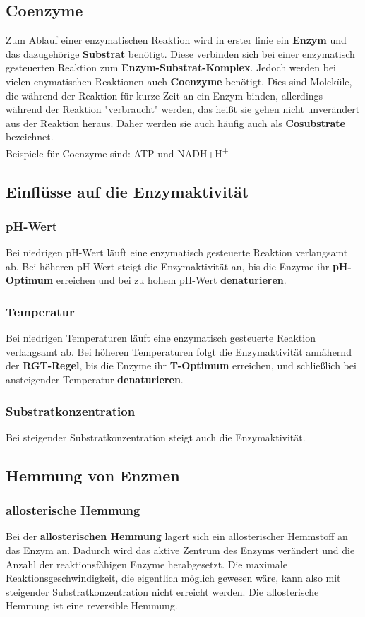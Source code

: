 \documentclass{article}
\begin{document}
    \subsection{Coenzyme}
    Zum Ablauf einer enzymatischen Reaktion wird in erster linie ein \textbf{Enzym} und das dazugehörige \textbf{Substrat} benötigt.
    Diese verbinden sich bei einer enzymatisch gesteuerten Reaktion zum \textbf{Enzym-Substrat-Komplex}.
    Jedoch werden bei vielen enymatischen Reaktionen auch \textbf{Coenzyme} benötigt.
    Dies sind Moleküle, die während der Reaktion für kurze Zeit an ein Enzym binden, allerdings während der Reaktion "verbraucht" werden, das heißt sie gehen nicht unverändert aus der Reaktion heraus.
    Daher werden sie auch häufig auch als \textbf{Cosubstrate} bezeichnet.\\
    Beispiele für Coenzyme sind: ATP und NADH+H\textsuperscript{+}
    \filbreak
    \subsection{Einflüsse auf die Enzymaktivität}
        \subsubsection{pH-Wert}
        Bei niedrigen pH-Wert läuft eine enzymatisch gesteuerte Reaktion verlangsamt ab.
        Bei höheren pH-Wert steigt die Enzymaktivität an, bis die Enzyme ihr \textbf{pH-Optimum} erreichen und bei zu hohem pH-Wert \textbf{denaturieren}.
        \filbreak
        \subsubsection{Temperatur}
        Bei niedrigen Temperaturen läuft eine enzymatisch gesteuerte Reaktion verlangsamt ab.
        Bei höheren Temperaturen folgt die Enzymaktivität annähernd der \textbf{RGT-Regel}, bis die Enzyme ihr \textbf{T-Optimum} erreichen, und schließlich bei ansteigender Temperatur \textbf{denaturieren}.
        \filbreak
        \subsubsection{Substratkonzentration}
        Bei steigender Substratkonzentration steigt auch die Enzymaktivität.
    \subsection{Hemmung von Enzmen}
        \subsubsection{allosterische Hemmung}
        Bei der \textbf{allosterischen Hemmung} lagert sich ein allosterischer Hemmstoff an das Enzym an.
        Dadurch wird das aktive Zentrum des Enzyms verändert und die Anzahl der reaktionsfähigen Enzyme herabgesetzt.
        Die maximale Reaktionsgeschwindigkeit, die eigentlich möglich gewesen wäre, kann also mit steigender Substratkonzentration nicht erreicht werden.
        Die allosterische Hemmung ist eine reversible Hemmung.
        \filbreak
\end{document}
